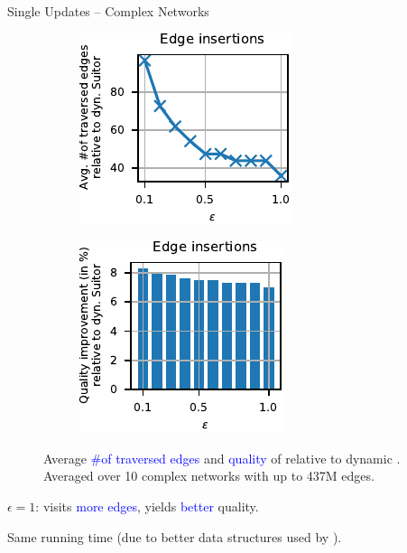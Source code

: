 \documentclass[10pt,titlepage,english,presentation]{beamer}
\newcommand{\emphcolor}{blue}
\renewcommand{\emph}[1]{\textcolor{\emphcolor}{#1}}
\begin{document}
\begin{frame}[t]{Single Updates -- Complex Networks}
\begin{figure}
\centering
\begin{subfigure}[t]{.5\textwidth}
\centering
\includegraphics[width=.7\textwidth]{../sources/plots/dyn-mwm/rw-insertion-cplx-vedges.pdf}
\end{subfigure}\hfill
\begin{subfigure}[t]{.5\textwidth}
\centering
\includegraphics[width=.7\textwidth]{../sources/plots/dyn-mwm/rw-insertion-cplx-qual.pdf}
\end{subfigure}
\caption*{\footnotesize Average \emph{\#of traversed edges} and \emph{quality} of
\dynmwmrandom relative to dynamic \suitor. Averaged over 10 complex networks with
up to 437M edges.}
\end{figure}\pause

$\epsilon = 1$: \dynmwmrandom visits \emph{\vedgesRWInsCplxHighEps more edges}, yields
\emph{\qualDropRWInsCplxHighEps better} quality.\smallskip

Same running time (due to better data structures used by \dynmwmrandom).

\end{frame}
\end{document}
